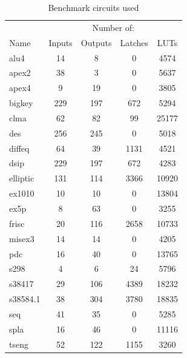 \documentclass[12pt,final,oneside]{dwThesis} %
\begin{document}
   \begin{table}
      \begin{center}
         \begin{tabular}{lcccc}
            \toprule
            & \multicolumn{4}{c}{Number of:}\\
            \cmidrule{2-5}
            Name & Inputs & Outputs & Latches & \acp{LUT}\\
            \midrule
            alu4 & 14 & 8 & 0 & 4574\\
            apex2 & 38 & 3 & 0 & 5637\\
            apex4 & 9 & 19 & 0 & 3805\\
            bigkey & 229 & 197 & 672 & 5294\\
            clma & 62 & 82 & 99 & 25177\\
            des & 256 & 245 & 0 & 5018\\
            diffeq & 64 & 39 & 1131 & 4521\\
            dsip & 229 & 197 & 672 & 4283\\
            elliptic & 131 & 114 & 3366 & 10920\\
            ex1010 & 10 & 10 & 0 & 13804\\
            ex5p & 8 & 63 & 0 & 3255\\
            frisc & 20 & 116 & 2658 & 10733\\
            misex3 & 14 & 14 & 0 & 4205\\
            pdc & 16 & 40 & 0 & 13765\\
            s298     & 4 & 6 & 24 & 5796\\
            s38417   & 29 & 106 & 4389 & 18232\\
            s38584.1 & 38 & 304 & 3780 & 18835\\
            seq      & 41 & 35 & 0 & 5285\\
            spla     & 16 & 46 & 0 & 11116\\
            tseng    & 52 & 122 & 1155 & 3260\\
            \bottomrule
         \end{tabular}
         \caption{Benchmark circuits used}
         \label{benchmarkList}
      \end{center}
   \end{table}
\end{document}
